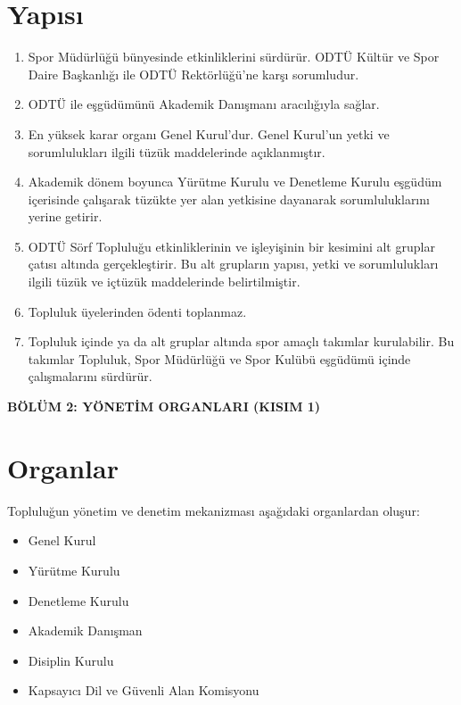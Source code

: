 \documentclass[11pt,a4paper]{article}
\begin{document}
\section{Yapısı}
\begin{enumerate}
    \item Spor Müdürlüğü bünyesinde etkinliklerini sürdürür. ODTÜ Kültür ve Spor Daire Başkanlığı ile ODTÜ Rektörlüğü’ne karşı sorumludur.
    \item ODTÜ ile eşgüdümünü Akademik Danışmanı aracılığıyla sağlar.
    \item En yüksek karar organı Genel Kurul’dur. Genel Kurul’un yetki ve sorumlulukları ilgili tüzük maddelerinde açıklanmıştır.
    \item Akademik dönem boyunca Yürütme Kurulu ve Denetleme Kurulu eşgüdüm içerisinde çalışarak tüzükte yer alan yetkisine dayanarak sorumluluklarını yerine getirir.
    \item ODTÜ Sörf Topluluğu etkinliklerinin ve işleyişinin bir kesimini alt gruplar çatısı altında gerçekleştirir. Bu alt grupların yapısı, yetki ve sorumlulukları ilgili tüzük ve içtüzük maddelerinde belirtilmiştir.
    \item Topluluk üyelerinden ödenti toplanmaz.
    \item Topluluk içinde ya da alt gruplar altında spor amaçlı takımlar kurulabilir. Bu takımlar Topluluk, Spor Müdürlüğü ve Spor Kulübü eşgüdümü içinde çalışmalarını sürdürür.
\end{enumerate}

\begin{center}
    {\Large \textbf{BÖLÜM 2: YÖNETİM ORGANLARI (KISIM 1)}}
\end{center}
\vspace{0.5cm}

\section{Organlar}
Topluluğun yönetim ve denetim mekanizması aşağıdaki organlardan oluşur:
\begin{itemize}
    \item Genel Kurul
    \item Yürütme Kurulu
    \item Denetleme Kurulu
    \item Akademik Danışman
    \item Disiplin Kurulu
    \item Kapsayıcı Dil ve Güvenli Alan Komisyonu
\end{itemize}
\end{document}
